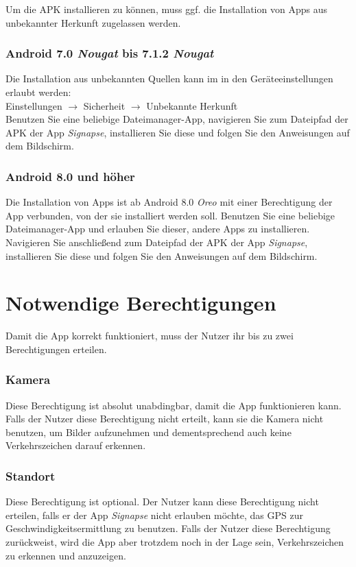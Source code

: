 \documentclass[12pt,a4paper,ngerman,enabledeprecatedfontcommands]{article}
\begin{document}
Um die APK installieren zu können, muss ggf. die Installation von Apps aus unbekannter Herkunft zugelassen werden.

\subsubsection{Android 7.0 \textit{Nougat} bis 7.1.2 \textit{Nougat}}
Die Installation aus unbekannten Quellen kann im in den Geräteeinstellungen erlaubt werden:\\
Einstellungen $\rightarrow$ Sicherheit $\rightarrow$ Unbekannte Herkunft\\
Benutzen Sie eine beliebige Dateimanager-App, navigieren Sie zum Dateipfad der APK der App \textit{Signapse}, installieren Sie diese und folgen Sie den Anweisungen auf dem Bildschirm.

\subsubsection{Android 8.0  und höher}
Die Installation von Apps ist ab Android 8.0 \textit{Oreo} mit einer Berechtigung der App verbunden, von der sie installiert werden soll. Benutzen Sie eine beliebige Dateimanager-App und erlauben Sie dieser, andere Apps zu installieren. Navigieren Sie anschließend zum Dateipfad der APK der App \textit{Signapse}, installieren Sie diese und folgen Sie den Anweisungen auf dem Bildschirm.

\section{Notwendige Berechtigungen}

Damit die App korrekt funktioniert, muss der Nutzer ihr bis zu zwei Berechtigungen erteilen.

\subsubsection*{Kamera} Diese Berechtigung ist absolut unabdingbar, damit die App funktionieren kann. Falls der Nutzer diese Berechtigung nicht erteilt, kann sie die Kamera nicht benutzen, um Bilder aufzunehmen und dementsprechend auch keine Verkehrszeichen darauf erkennen.

\subsubsection*{Standort} Diese Berechtigung ist optional. Der Nutzer kann diese Berechtigung nicht erteilen, falls er der App \textit{Signapse} nicht erlauben möchte, das GPS zur Geschwindigkeitsermittlung zu benutzen. Falls der Nutzer diese Berechtigung zurückweist, wird die App aber trotzdem noch in der Lage sein, Verkehrszeichen zu erkennen und anzuzeigen.
\end{document}
